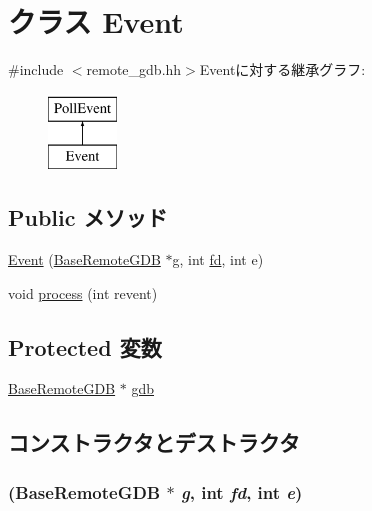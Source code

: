 \hypertarget{classBaseRemoteGDB_1_1Event}{
\section{クラス Event}
\label{classBaseRemoteGDB_1_1Event}
}


{\ttfamily \#include $<$remote\_\-gdb.hh$>$}Eventに対する継承グラフ:\begin{figure}[H]
\begin{center}
\leavevmode
\includegraphics[height=2cm]{classBaseRemoteGDB_1_1Event}
\end{center}
\end{figure}
\subsection*{Public メソッド}
\begin{DoxyCompactItemize}
\item 
\hyperlink{classBaseRemoteGDB_1_1Event_a2d589f9147c437ef4e2aa278258c7465}{Event} (\hyperlink{classBaseRemoteGDB}{BaseRemoteGDB} $\ast$g, int \hyperlink{classBaseRemoteGDB_a6f8059414f0228f0256115e024eeed4b}{fd}, int e)
\item 
void \hyperlink{classBaseRemoteGDB_1_1Event_aedacbaeee0c89ceca526874c34f6b20b}{process} (int revent)
\end{DoxyCompactItemize}
\subsection*{Protected 変数}
\begin{DoxyCompactItemize}
\item 
\hyperlink{classBaseRemoteGDB}{BaseRemoteGDB} $\ast$ \hyperlink{classBaseRemoteGDB_1_1Event_abc7630d7a55d0751927fed9b12d7b202}{gdb}
\end{DoxyCompactItemize}


\subsection{コンストラクタとデストラクタ}
\hypertarget{classBaseRemoteGDB_1_1Event_a2d589f9147c437ef4e2aa278258c7465}{
\subsubsection[{Event}]{ ({\bf BaseRemoteGDB} $\ast$ {\em g}, \/  int {\em fd}, \/  int {\em e})}}
\label{classBaseRemoteGDB_1_1Event_a2d589f9147c437ef4e2aa278258c7465}



